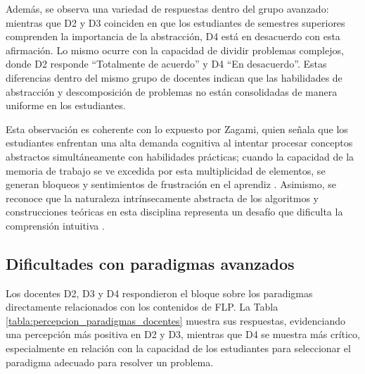 Además, se observa una variedad de respuestas dentro del grupo avanzado: mientras que D2 y D3 coinciden en que los estudiantes de semestres superiores comprenden la importancia de la abstracción, D4 está en desacuerdo con esta afirmación. Lo mismo ocurre con la capacidad de dividir problemas complejos, donde D2 responde ``Totalmente de acuerdo'' y D4 ``En desacuerdo''. Estas diferencias dentro del mismo grupo de docentes indican que las habilidades de abstracción y descomposición de problemas no están consolidadas de manera uniforme en los estudiantes.

Esta observación es coherente con lo expuesto por Zagami, quien señala que los estudiantes enfrentan una alta demanda cognitiva al intentar procesar conceptos abstractos simultáneamente con habilidades prácticas; cuando la capacidad de la memoria de trabajo se ve excedida por esta multiplicidad de elementos, se generan bloqueos y sentimientos de frustración en el aprendiz \cite{zagami2023}. Asimismo, se reconoce que la naturaleza intrínsecamente abstracta de los algoritmos y construcciones teóricas en esta disciplina representa un desafío que dificulta la comprensión intuitiva \cite{Stamenkovic2024AWE}.

\subsection{Dificultades con paradigmas avanzados}

Los docentes D2, D3 y D4 respondieron el bloque sobre los paradigmas directamente relacionados con los contenidos de FLP. La Tabla \ref{tabla:percepcion_paradigmas_docentes} muestra sus respuestas, evidenciando una percepción más positiva en D2 y D3, mientras que D4 se muestra más crítico, especialmente en relación con la capacidad de los estudiantes para seleccionar el paradigma adecuado para resolver un problema.

